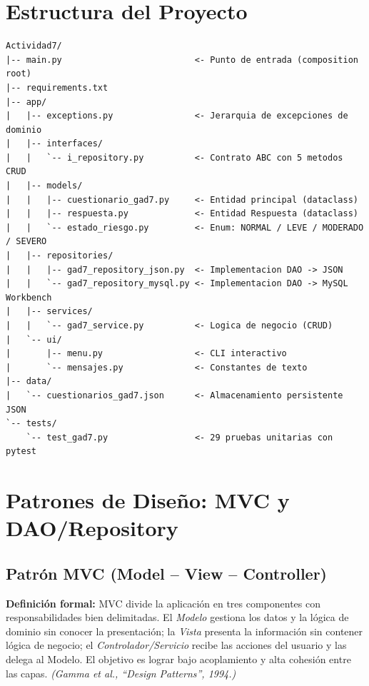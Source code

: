 \documentclass[12pt, a4paper]{article}
\begin{document}
\section{Estructura del Proyecto}

\begin{lstlisting}[language={}, backgroundcolor=\color{darkbg},
                   basicstyle=\ttfamily\footnotesize\color{white},
                   frame=single, rulecolor=\color{darkbg}]
Actividad7/
|-- main.py                          <- Punto de entrada (composition root)
|-- requirements.txt
|-- app/
|   |-- exceptions.py                <- Jerarquia de excepciones de dominio
|   |-- interfaces/
|   |   `-- i_repository.py          <- Contrato ABC con 5 metodos CRUD
|   |-- models/
|   |   |-- cuestionario_gad7.py     <- Entidad principal (dataclass)
|   |   |-- respuesta.py             <- Entidad Respuesta (dataclass)
|   |   `-- estado_riesgo.py         <- Enum: NORMAL / LEVE / MODERADO / SEVERO
|   |-- repositories/
|   |   |-- gad7_repository_json.py  <- Implementacion DAO -> JSON
|   |   `-- gad7_repository_mysql.py <- Implementacion DAO -> MySQL Workbench
|   |-- services/
|   |   `-- gad7_service.py          <- Logica de negocio (CRUD)
|   `-- ui/
|       |-- menu.py                  <- CLI interactivo
|       `-- mensajes.py              <- Constantes de texto
|-- data/
|   `-- cuestionarios_gad7.json      <- Almacenamiento persistente JSON
`-- tests/
    `-- test_gad7.py                 <- 29 pruebas unitarias con pytest
\end{lstlisting}

\section{Patrones de Diseño: MVC y DAO/Repository}

\subsection{Patrón MVC (Model -- View -- Controller)}

\textbf{Definición formal:} MVC divide la aplicación en tres componentes con
responsabilidades bien delimitadas. El \textit{Modelo} gestiona los datos y la
lógica de dominio sin conocer la presentación; la \textit{Vista} presenta la
información sin contener lógica de negocio; el \textit{Controlador/Servicio}
recibe las acciones del usuario y las delega al Modelo. El objetivo es lograr
bajo acoplamiento y alta cohesión entre las capas.
\textit{(Gamma et al., ``Design Patterns'', 1994.)}
\end{document}
